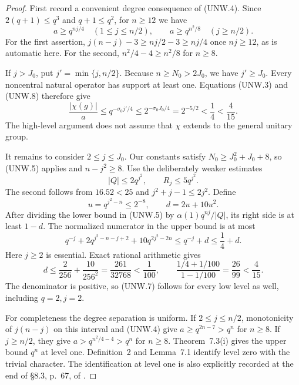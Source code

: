 \begin{proof}
First record a convenient degree consequence of (UNW.4).  Since
$2(q+1)\le q^3$ and $q+1\le q^2$, for $n\ge12$ we have
\[
 a\ge q^{nj/4}\quad(1\le j\le n/2),\qquad
 a\ge q^{n^2/8}\quad(j\ge n/2).                             \tag{UNW.8}
\]
For the first assertion, $j(n-j)-3\ge nj/2-3\ge nj/4$
once $nj\ge12$, as is automatic here.  For the second,
$n^2/4-4\ge n^2/8$ for $n\ge8$.

If $j>J_0$, put $j'=\min\{j,n/2\}$.  Because $n\ge N_0>2J_0$,
we have $j'\ge J_0$.  Every noncentral natural operator has support
at least one.  Equations (UNW.3) and (UNW.8) therefore give
\[
 \frac{|\chi(g)|}{a}
 \le q^{-\sigma_0 j'/4}
 \le 2^{-\sigma_0J_0/4}
 =2^{-5/2}<\frac14<\frac4{15}.                             \tag{UNW.9}
\]
The high-level argument does not assume that $\chi$ extends to
the general unitary group.

It remains to consider $2\le j\le J_0$.  Our constants satisfy
$N_0\ge J_0^2+J_0+8$, so (UNW.5) applies and $n-j^2\ge8$.
Use the deliberately weaker estimates
\[
                    |Q|\le2q^{j^2},\qquad R_j\le5q^{j^2}.
                                                               \tag{UNW.10}
\]
The second follows from $16.52<25$ and
$j^2+j-1\le2j^2$.  Define
\[
 u=q^{j^2-n}\le2^{-8},\qquad d=2u+10u^2.
\]
After dividing the lower bound in (UNW.5) by
$\alpha(1)q^{nj}/|Q|$, its right side is at least $1-d$.
The normalized numerator in the upper bound is at most
\[
 q^{-j}+2q^{j^2-n-j+2}+10q^{2j^2-2n}
 \le q^{-j}+d\le\frac14+d.
\]
Here $j\ge2$ is essential.  Exact rational arithmetic gives
\[
 d\le\frac2{256}+\frac{10}{256^2}
      =\frac{261}{32768}<\frac1{100},\qquad
 \frac{1/4+1/100}{1-1/100}=\frac{26}{99}<\frac4{15}.
                                                               \tag{UNW.11}
\]
The denominator is positive, so (UNW.7) follows for every low
level as well, including $q=2,j=2$.

For completeness the degree separation is uniform.  If
$2\le j\le n/2$, monotonicity of $j(n-j)$ on this interval and
(UNW.4) give $a\ge q^{2n-7}>q^n$ for $n\ge8$.
If $j\ge n/2$, they give $a>q^{n^2/4-4}>q^n$ for $n\ge8$.
Theorem~7.3(i) gives the upper bound $q^n$ at level one.
Definition~2 and Lemma~7.1 identify level zero with the trivial
character.  The identification at level one is also explicitly
recorded at the end of \S8.3, p.~67, of \cite{UNW:GLT2020}.
\end{proof}


